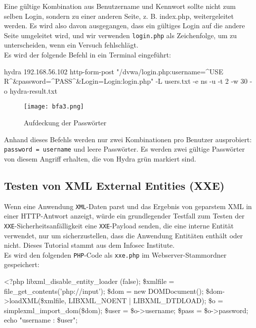 Eine gültige Kombination aus Benutzername und Kennwort sollte nicht zum selben Login, sondern zu einer anderen Seite, z. B. index.php, weitergeleitet werden. Es wird also davon ausgegangen, dass ein gültiges Login auf die andere Seite umgeleitet wird, und wir verwenden \texttt{login.php} als Zeichenfolge, um zu unterscheiden, wenn ein Versuch fehlschlägt\cite[145]{najera2016kali}.\\

Es wird der folgende Befehl in ein Terminal eingeführt\cite[145]{najera2016kali}:

\begin{LaTeXCode}[caption={Befehl durch Terminal},captionpos=b, label=LaTeXCode:beheldt1][numbers=none]
hydra 192.168.56.102 http-form-post "/dvwa/login.php:username=^USE
R^&password=^PASS^&Login=Login:login.php" -L users.txt -e ns -u -t 2 -w 30 -o hydra-result.txt
\end{LaTeXCode}

\begin{figure}[h]
	\centering
	\texttt{[image: bfa3.png]}
	\caption{Aufdeckung der Passwörter}
\end{figure}

Anhand dieses Befehls werden nur zwei Kombinationen pro Benutzer ausprobiert: \texttt{password = username} und leere Passwörter. Es werden zwei gültige Passwörter von diesem Angriff erhalten, die von Hydra grün markiert sind\cite[145]{najera2016kali}.

\subsection{Testen von XML External Entities (XXE)}

Wenn eine Anwendung \texttt{XML}-Daten parst und das Ergebnis von geparstem XML in einer HTTP-Antwort anzeigt, würde ein grundlegender Testfall zum Testen der \texttt{XXE}-Sicherheitsanfälligkeit eine \texttt{XXE}-Payload senden, die eine interne Entität verwendet, nur um sicherzustellen, dass die Anwendung Entitäten enthält oder nicht. Dieses Tutorial stammt aus dem Infosec Institute\cite{infosec18}.\\

Es wird den folgenden \texttt{PHP}-Code als \texttt{xxe.php} im Webserver-Stammordner gespeichert:

\newpage

\begin{LaTeXCode}[caption={XXE PHP-Datei},captionpos=b][numbers=none]
<?php
libxml_disable_entity_loader (false);
\$xmlfile = file_get_contents('php://input');
\$dom = new DOMDocument();
\$dom->loadXML(\$xmlfile, LIBXML_NOENT | LIBXML_DTDLOAD);
\$o = simplexml_import_dom(\$dom);
\$user = \$o->username;
\$pass = \$o->password;
echo "username : \$user";\\
\end{LaTeXCode}


